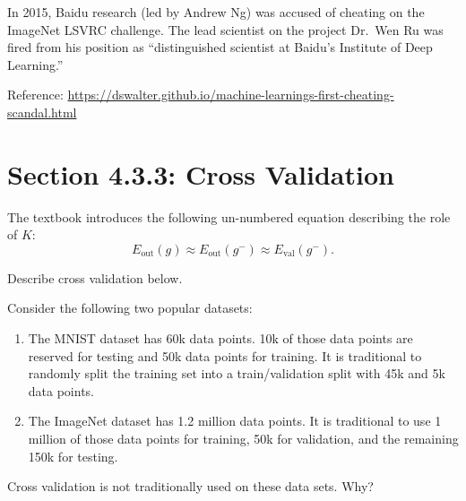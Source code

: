 \documentclass[10pt]{exam}
\theoremstyle{definition}
\newcommand{\Eout}{E_{\text{out}}}
\newcommand{\Eval}{E_{\text{val}}}
\begin{document}
\newpage
\noindent
In 2015, Baidu research (led by Andrew Ng) was accused of cheating on the ImageNet LSVRC challenge.
The lead scientist on the project Dr.\ Wen Ru was fired from his position as ``distinguished scientist at Baidu's Institute of Deep Learning.''

Reference:
\url{https://dswalter.github.io/machine-learnings-first-cheating-scandal.html}

\newpage
\section*{Section 4.3.3: Cross Validation}

The textbook introduces the following un-numbered equation describing the role of $K$:
\begin{equation*}
    \Eout(g) \approx \Eout(g^-) \approx \Eval(g^-).
\end{equation*}

\vspace{3in}
\noindent
Describe cross validation below.

\newpage
\noindent
Consider the following two popular datasets:
\begin{enumerate}
    \item
        The MNIST dataset has 60k data points.
        10k of those data points are reserved for testing
        and 50k data points for training.
        It is traditional to randomly split the training set into a train/validation split with 45k and 5k data points.

    \item
        The ImageNet dataset has 1.2 million data points.
        It is traditional to use 1 million of those data points for training,
        50k for validation,
        and the remaining 150k for testing.
\end{enumerate}
Cross validation is not traditionally used on these data sets.
Why?
\newpage
\end{document}
